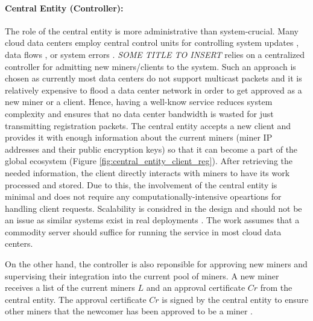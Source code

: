 \documentclass{article}
\newcommand{\projTitle}{SOME TITLE TO INSERT}
\begin{document}
\paragraph{Central Entity (Controller):} The role of the central entity is more administrative than system-crucial. Many cloud data centers employ central control units for controlling system updates \cite{microsoft-autopilot}, data flows \cite{google_jupiter}, or system errors \cite{microsoft_netpoirot}. \textit{\projTitle} relies on a centralized controller for admitting new miners/clients to the system. Such an approach is chosen as currently most data centers do not support multicast packets and it is relatively expensive to flood a data center network in order to get approved as a new miner or a client. Hence, having a well-know service reduces system complexity and ensures that no data center bandwidth is wasted for just transmitting registration packets. The central entity accepts a new client and provides it with enough information about the current miners (miner IP addresses and their public encryption keys) so that it can become a part of the global ecosystem (Figure \ref{fig:central_entity_client_reg}). After retrieving the needed information, the client directly interacts with miners to have its work processed and stored. Due to this, the involvement of the central entity is minimal and does not require any computationally-intensive opeartions for handling client requests. Scalability is considred in the design and should not be an issue as similar systems exist in real deployments \cite{hadoop_example}. The work assumes that a commodity server should suffice for running the service in most cloud data centers. 
\par


\noindent \newline On the other hand, the controller is also reponsible for approving new miners and supervising their integration into the current pool of miners. A new miner receives a list of the current miners $L$ and an approval certificate $Cr$ from the central entity.
The approval certificate $Cr$ is signed by the central entity to ensure other miners that the newcomer has been approved to be a miner \cite{public-auth-certificate}.
\end{document}
